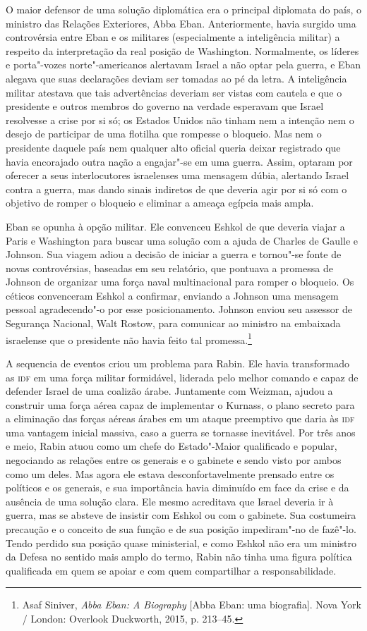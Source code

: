 O maior defensor de uma solução diplomática era o principal diplomata do
país, o ministro das Relações Exteriores, Abba Eban. Anteriormente,
havia surgido uma controvérsia entre Eban e os militares (especialmente
a inteligência militar) a respeito da interpretação da real posição de
Washington. Normalmente, os líderes e porta"-vozes norte"-americanos
alertavam Israel a não optar pela guerra, e Eban alegava que suas
declarações deviam ser tomadas ao pé da letra. A inteligência militar
atestava que tais advertências deveriam ser vistas com cautela e que o
presidente e outros membros do governo na verdade esperavam que Israel
resolvesse a crise por si só; os Estados Unidos não tinham nem a intenção nem o
desejo de participar de uma flotilha que rompesse o bloqueio. Mas nem o
presidente daquele país nem qualquer alto oficial queria deixar registrado
que havia encorajado outra nação a engajar"-se em uma guerra. Assim,
optaram por oferecer a seus interlocutores israelenses uma mensagem
dúbia, alertando Israel contra a guerra, mas dando sinais indiretos de
que deveria agir por si só com o objetivo de romper o bloqueio e
eliminar a ameaça egípcia mais ampla.

Eban se opunha à opção militar. Ele convenceu Eshkol de que deveria
viajar a Paris e Washington para buscar uma solução com a ajuda de
Charles de Gaulle e Johnson. Sua viagem adiou a decisão de iniciar a
guerra e tornou"-se fonte de novas controvérsias, baseadas em seu
relatório, que pontuava a promessa de Johnson de organizar uma força naval
multinacional para romper o bloqueio. Os céticos convenceram Eshkol a
confirmar, enviando a Johnson uma mensagem pessoal agradecendo"-o por
esse posicionamento. Johnson enviou seu assessor de Segurança Nacional,
Walt Rostow, para comunicar ao ministro na embaixada israelense que o
presidente não havia feito tal promessa.\footnote{Asaf Siniver, \emph{Abba Eban: A Biography} {[}Abba Eban: uma biografia{]}. Nova York / London: Overlook
Duckworth, 2015, p. 213--45.}

A sequencia de eventos criou um problema para Rabin. Ele havia
transformado as \textsc{idf} em uma força militar formidável, liderada pelo
melhor comando e capaz de defender Israel de uma coalizão árabe.
Juntamente com Weizman, ajudou a construir uma força aérea capaz de
implementar o Kurnass, o plano secreto para a eliminação das forças
aéreas árabes em um ataque preemptivo que daria às \textsc{idf} uma vantagem
inicial massiva, caso a guerra se tornasse inevitável. Por três anos e
meio, Rabin atuou como um chefe do Estado"-Maior qualificado e popular,
negociando as relações entre os generais e o gabinete e sendo visto por
ambos como um deles. Mas agora ele estava desconfortavelmente prensado
entre os políticos e os generais, e sua importância havia diminuído em
face da crise e da ausência de uma solução clara. Ele mesmo acreditava
que Israel deveria ir à guerra, mas se absteve de insistir com Eshkol ou
com o gabinete. Sua costumeira precaução e o conceito de sua função e de
sua posição impediram"-no de fazê"-lo. Tendo perdido sua posição quase
ministerial, e como Eshkol não era um ministro da Defesa no sentido mais
amplo do termo, Rabin não tinha uma figura política qualificada em quem
se apoiar e com quem compartilhar a responsabilidade.

